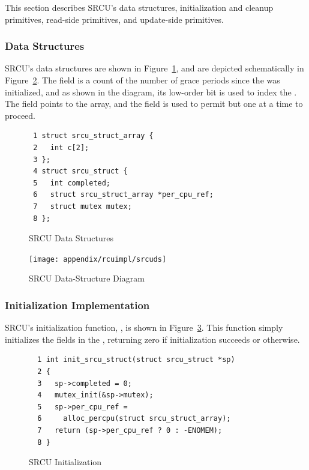 This section describes SRCU's data structures, initialization and
cleanup primitives, read-side primitives, and update-side primitives.

\subsubsection{Data Structures}
\label{sec:app:rcuimpl:Data Structures}

SRCU's data structures are shown in
Figure~\ref{fig:app:rcuimpl:SRCU Data Structures},
and are depicted schematically in
Figure~\ref{fig:app:whymb:SRCU Data-Structure Diagram}.
The  field is a count of the number of grace periods
since the   was initialized, and as shown in the
diagram, its low-order bit is used to index the
 .
The  field points to the array, and the
 field is used to permit but one  at
a time to proceed.

\begin{figure}[htbp]
{ \scriptsize
\begin{verbatim}
 1 struct srcu_struct_array {
 2   int c[2];
 3 };
 4 struct srcu_struct {
 5   int completed;
 6   struct srcu_struct_array *per_cpu_ref;
 7   struct mutex mutex;
 8 };
\end{verbatim}
}
\caption{SRCU Data Structures}
\label{fig:app:rcuimpl:SRCU Data Structures}
\end{figure}

\begin{figure}[htb]
\centering
\texttt{[image: appendix/rcuimpl/srcuds]}
\caption{SRCU Data-Structure Diagram}
\label{fig:app:whymb:SRCU Data-Structure Diagram}
\end{figure}

\subsubsection{Initialization Implementation}
\label{sec:app:rcuimpl:Initialization Implementation}

SRCU's initialization function, , is shown in
Figure~\ref{fig:app:rcuimpl:SRCU Initialization}.
This function simply initializes the fields in the
 , returning zero if initialization succeeds
or  otherwise.

\begin{figure}[htbp]
{ \scriptsize
\begin{verbatim}
  1 int init_srcu_struct(struct srcu_struct *sp)
  2 {
  3   sp->completed = 0;
  4   mutex_init(&sp->mutex);
  5   sp->per_cpu_ref =
  6     alloc_percpu(struct srcu_struct_array);
  7   return (sp->per_cpu_ref ? 0 : -ENOMEM);
  8 }
\end{verbatim}
}
\caption{SRCU Initialization}
\label{fig:app:rcuimpl:SRCU Initialization}
\end{figure}

